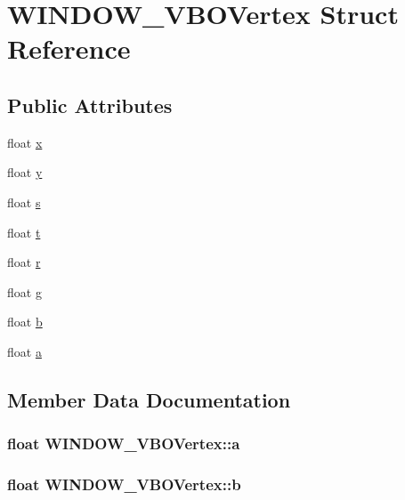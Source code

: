 \hypertarget{struct_w_i_n_d_o_w___v_b_o_vertex}{
\section{WINDOW\_\-VBOVertex Struct Reference}
\label{struct_w_i_n_d_o_w___v_b_o_vertex}
}
\subsection*{Public Attributes}
\begin{CompactItemize}
\item 
float \hyperlink{struct_w_i_n_d_o_w___v_b_o_vertex_c430162e5d400e1d2be0887a7bb2ac49}{x}
\item 
float \hyperlink{struct_w_i_n_d_o_w___v_b_o_vertex_d41e4ccc3ebee1e50a9e6adf83c75e58}{y}
\item 
float \hyperlink{struct_w_i_n_d_o_w___v_b_o_vertex_9125614cf349cd5e35c305c2aa48006b}{s}
\item 
float \hyperlink{struct_w_i_n_d_o_w___v_b_o_vertex_801a22c109c33970f9d7413133537a82}{t}
\item 
float \hyperlink{struct_w_i_n_d_o_w___v_b_o_vertex_329b2b512f70ae57ba8407a262323ab1}{r}
\item 
float \hyperlink{struct_w_i_n_d_o_w___v_b_o_vertex_7bd67385ed968a48425a597c0bd90b0d}{g}
\item 
float \hyperlink{struct_w_i_n_d_o_w___v_b_o_vertex_8ec73c82a5544b93fd511bacd42c8ff5}{b}
\item 
float \hyperlink{struct_w_i_n_d_o_w___v_b_o_vertex_f393249a14405078912feae19943eff3}{a}
\end{CompactItemize}


\subsection{Member Data Documentation}
\hypertarget{struct_w_i_n_d_o_w___v_b_o_vertex_f393249a14405078912feae19943eff3}{
\subsubsection[{a}]{\setlength{\rightskip}{0pt plus 5cm}float {\bf WINDOW\_\-VBOVertex::a}}}
\label{struct_w_i_n_d_o_w___v_b_o_vertex_f393249a14405078912feae19943eff3}


\hypertarget{struct_w_i_n_d_o_w___v_b_o_vertex_8ec73c82a5544b93fd511bacd42c8ff5}{
\subsubsection[{b}]{\setlength{\rightskip}{0pt plus 5cm}float {\bf WINDOW\_\-VBOVertex::b}}}
\label{struct_w_i_n_d_o_w___v_b_o_vertex_8ec73c82a5544b93fd511bacd42c8ff5}


